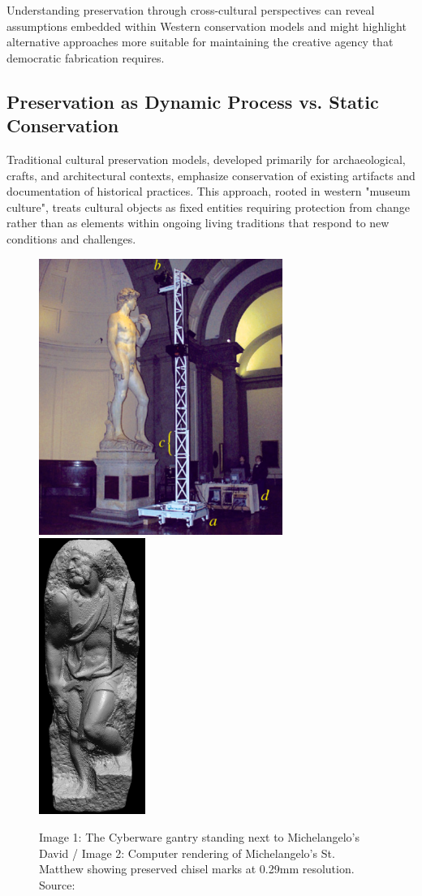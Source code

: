Understanding preservation through cross-cultural perspectives can reveal assumptions embedded within Western conservation models and might highlight alternative approaches more suitable for maintaining the creative agency that democratic fabrication requires.

\subsection{Preservation as Dynamic Process vs. Static Conservation}

Traditional cultural preservation models, developed primarily for archaeological, crafts, and architectural contexts, emphasize conservation of existing artifacts and documentation of historical practices. This approach, rooted in western "museum culture", treats cultural objects as fixed entities requiring protection from change rather than as elements within ongoing living traditions that respond to new conditions and challenges.

\begin{figure}[H]
\centering
\includegraphics[height=9cm]{figures/chapter2/michelangelo_figure6.png}
\hspace{0.01cm}
\includegraphics[height=9cm]{figures/chapter2/michelangelo_figure9.png}
\caption{Image 1: The Cyberware gantry standing next to Michelangelo's David / Image 2: Computer rendering of Michelangelo's St. Matthew showing preserved chisel marks at 0.29mm resolution. Source: \citet{levoy2000}}
\label{fig:michelangelo_gantry}
\end{figure}


